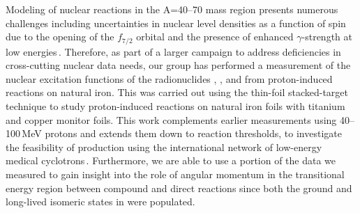 Modeling of nuclear reactions in 
the A=40--70 mass region presents numerous challenges including uncertainties in nuclear level densities as a function of spin due to the opening of the $f_{7/2}$ orbital and the presence of enhanced $\gamma$-strength at low energies\,\cite{Voinov2004a,Algin2008,Algin2007}.  
Therefore, as part of a larger campaign to address deficiencies in cross-cutting nuclear data needs, our group has performed a   measurement of the   nuclear excitation functions of the radionuclides ,   , and  from proton-induced reactions on natural iron.
This was carried out 
using the thin-foil stacked-target technique to study proton-induced reactions on 
natural iron foils with titanium and copper monitor foils.
This work 
complements 
earlier measurements using 40--100\,MeV protons  and extends them down to reaction thresholds,  to investigate the feasibility of production using the international network   of low-energy medical cyclotrons\,\cite{Graves2016}. 
Furthermore, we are able to use a portion of the data we measured to gain insight into the role of angular momentum in the transitional energy region between compound and direct reactions since both the ground and long-lived isomeric states in  were populated.  


